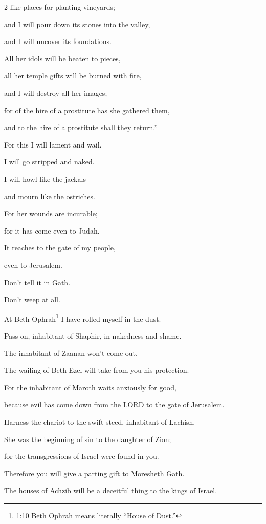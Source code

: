 \begin{multicols}{2}
like places for planting vineyards;

and I will pour down its stones into the valley,

and I will uncover its foundations.

\myverse{}All her idols will be beaten to pieces,

all her temple gifts will be burned with fire,

and I will destroy all her images;

for of the hire of a prostitute has she gathered them,

and to the hire of a prostitute shall they return.”


\vspace{\baselineskip} \myverse{}For this I will lament and wail.

I will go stripped and naked.

I will howl like the jackals

and mourn like the ostriches.

\myverse{}For her wounds are incurable;

for it has come even to Judah.

It reaches to the gate of my people,

even to Jerusalem.

\myverse{}Don’t tell it in Gath.

Don’t weep at all.

At Beth Ophrah\footnote{1:10 Beth Ophrah means literally “House of Dust.”} I have rolled myself in the dust.

\myverse{}Pass on, inhabitant of Shaphir, in nakedness and shame.

The inhabitant of Zaanan won’t come out.

The wailing of Beth Ezel will take from you his protection.

\myverse{}For the inhabitant of Maroth waits anxiously for good,

because evil has come down from the LORD to the gate of Jerusalem.

\myverse{}Harness the chariot to the swift steed, inhabitant of Lachish.

She was the beginning of sin to the daughter of Zion;

for the transgressions of Israel were found in you.

\myverse{}Therefore you will give a parting gift to Moresheth Gath.

The houses of Achzib will be a deceitful thing to the kings of Israel.


\end{multicols}
